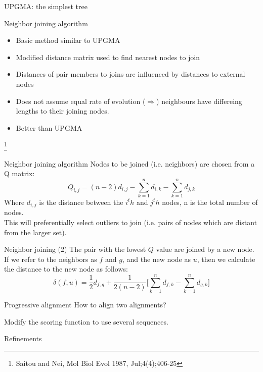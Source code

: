 \documentclass[pdf]{beamer}
\newcommand\blfootnote[1]{%
  \begingroup  %
  \renewcommand\thefootnote{}\footnote{#1}%
  \addtocounter{footnote}{-1}  %
  \endgroup
}
\begin{document}
\begin{frame}{UPGMA: the simplest tree}
\begin{figure}[ht]
 \end{figure}
\end{frame}

\begin{frame}{Neighbor joining algorithm}
  \begin{itemize}
  \item Basic method similar to UPGMA
  \item Modified distance matrix used to find nearest nodes to join
  \item Distances of pair members to joins are influenced by distances to external nodes
  \item Does not assume equal rate of evolution ($\Rightarrow$) neighbours have
    differeing lengths to their joining nodes.
  \item Better than UPGMA
  \end{itemize}
\blfootnote{Saitou and Nei, Mol Biol Evol 1987, Jul;4(4);406-25}  
\end{frame}

\begin{frame}{Neighbor joining algorithm}
  Nodes to be joined (i.e. neighbors) are chosen from a Q matrix:
  $$
  Q_{i,j} = (n-2)d_{i,j} - \sum_{k=1}^n{d_{i,k}} - \sum_{k=1}^n{d_{j,k}}
  $$
  Where $d_{i,j}$ is the distance between the $i^th$ and $j^th$ nodes, n is
  the total number of nodes.\\
  This will preferentially select outliers to join (i.e. pairs of nodes
  which are distant from the larger set).
\end{frame}

\begin{frame}{Neighbor joining (2)}
  The pair with the lowest $Q$ value are joined by a new node. If we refer to the
  neighbors as $f$ and $g$, and the new node as $u$, then we calculate the distance
  to the new node as follows:
  $$
  \delta(f,u) = \frac{1}{2}d_{f,g} + \frac{1}{2(n-2)}\big[ \sum_{k=1}^n{d_{f,k}} - \sum_{k=1}^n{d_{g,k}} \big]
  $$
\end{frame}

\begin{frame}{Progressive alignment}
  How to align two alignments?
  
  Modify the scoring function to use several sequences.
\end{frame}

\begin{frame}{Refinements}

\end{frame}
\end{document}
